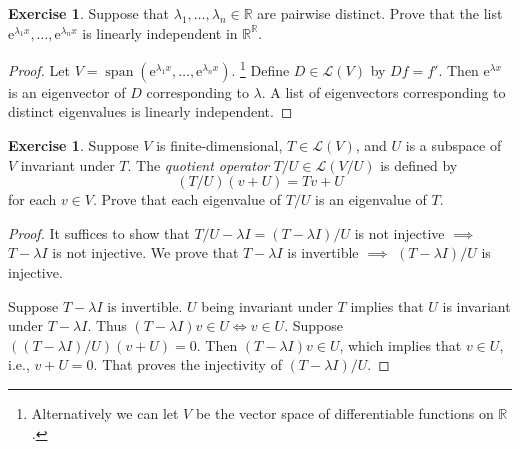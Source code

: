 \documentclass{tufte-handout}
\theoremstyle{plain} %
\theoremstyle{definition}
\newtheorem{exer}[thm]{Exercise}
\theoremstyle{remark}
\newcommand{\R}{\mathbb{R}}
\renewcommand{\L}{\mathcal{L}}
\newcommand{\e}{\mathrm{e}}
\DeclareMathOperator{\spn}{span}
\begin{document}
\begin{exer}
	Suppose that $\lambda_1,\dots,\lambda_n\in\R$ are pairwise distinct. Prove that the list $\e^{\lambda_1x},\dots,\e^{\lambda_nx}$ is linearly independent in $\R^\R$.
\end{exer}
\begin{proof}
	Let $V=\spn(\e^{\lambda_1x},\dots,\e^{\lambda_nx})$.%
	\footnote{Alternatively we can let $V$ be the vector space of differentiable functions on $\R$.}
	Define $D\in\L(V)$ by $Df=f'$. Then $\e^{\lambda x}$ is an eigenvector of $D$ corresponding to $\lambda$. A list of eigenvectors corresponding to distinct eigenvalues is linearly independent.
\end{proof}

\begin{exer}
	Suppose $V$ is finite-dimensional, $T\in\L(V)$, and $U$ is a subspace of $V$ invariant under $T$. The \emph{quotient operator} $T/U\in\L(V/U)$ is defined by
	\[(T/U)(v+U)=Tv+U\]
	for each $v\in V$. Prove that each eigenvalue of $T/U$ is an eigenvalue of $T$.
\end{exer}
\begin{proof}
	It suffices to show that $T/U-\lambda I=(T-\lambda I)/U$ is not injective $\implies$ $T-\lambda I$ is not injective. We prove that $T-\lambda I$ is invertible $\implies$ $(T-\lambda I)/U$ is injective.

	Suppose $T-\lambda I$ is invertible. $U$ being invariant under $T$ implies that $U$ is invariant under $T-\lambda I$. Thus $(T-\lambda I)v\in U\iff v\in U$. Suppose $((T-\lambda I)/U)(v+U)=0$. Then $(T-\lambda I)v\in U$, which implies that $v\in U$, i.e., $v+U=0$. That proves the injectivity of $(T-\lambda I)/U$.
\end{proof}
\end{document}
